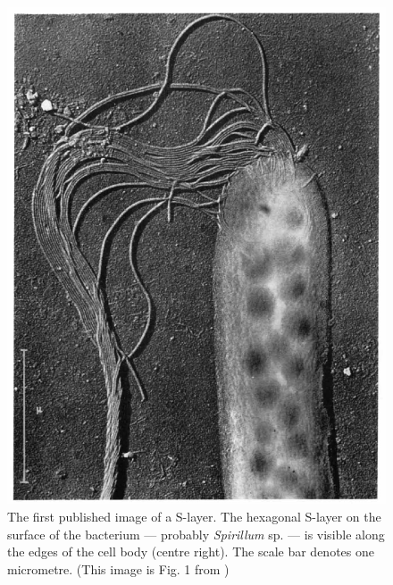     \begin{figure}[p] %
            \begin{center}
                \includegraphics[]{intro/img/firstslayer.pdf}
            \end{center}
            \caption[The first published image of a \ac{S-layer}.]{The first published image of a \ac{S-layer}. The hexagonal \ac{S-layer} on the surface of the bacterium --- probably \textit{Spirillum} sp. --- is visible along the edges of the cell body (centre right). The scale bar denotes one micrometre. (This image is Fig. 1 from  )}
            \label{fig:firstslayer}
    \end{figure}
    


\endinput

Any text after an \endinput is ignored.
You could put scraps here or things in progress.
